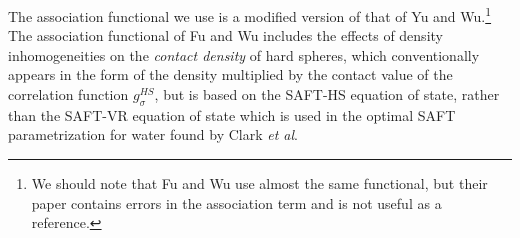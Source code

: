 \documentclass[letterpaper,twocolumn,amsmath,amssymb,prb]{revtex4-1}
\begin{document}
The association functional we use is a modified version of that of Yu
and Wu\cite{yu2002fmt-dft-inhomogeneous-associating}.\footnote{We
  should note that Fu and Wu\cite{fu2005vapor-liquid-dft} use almost
  the same functional, but their paper contains errors in the
  association term and is not useful as a reference.}  The association
functional of Fu and Wu includes the effects of density
inhomogeneities on the \emph{contact density} of hard spheres, which
conventionally appears in the form of the density multiplied by the
contact value of the correlation function $g^{HS}_\sigma$, but is
based on the SAFT-HS equation of state, rather than the SAFT-VR
equation of state\cite{gil-villegas-1997-SAFT-VR} which is used in the
optimal SAFT parametrization for water found by Clark \emph{et
  al}\cite{clark2006developing}.
\end{document}
